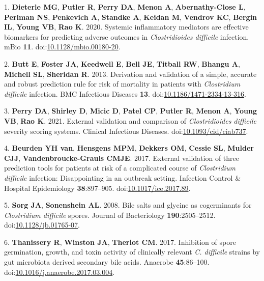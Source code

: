 \documentclass[
  12pt,
]{article}
\newenvironment{cslreferences}%
  {}%
  {\par}
\begin{document}
\hypertarget{refs}{}
\begin{cslreferences}
\leavevmode\hypertarget{ref-Dieterle2020}{}%
1. \textbf{Dieterle MG}, \textbf{Putler R}, \textbf{Perry DA},
\textbf{Menon A}, \textbf{Abernathy-Close L}, \textbf{Perlman NS},
\textbf{Penkevich A}, \textbf{Standke A}, \textbf{Keidan M},
\textbf{Vendrov KC}, \textbf{Bergin IL}, \textbf{Young VB}, \textbf{Rao
K}. 2020. Systemic inflammatory mediators are effective biomarkers for
predicting adverse outcomes in \emph{Clostridioides difficile}
infection. mBio \textbf{11}.
doi:\href{https://doi.org/10.1128/mbio.00180-20}{10.1128/mbio.00180-20}.

\leavevmode\hypertarget{ref-Butt2013}{}%
2. \textbf{Butt E}, \textbf{Foster JA}, \textbf{Keedwell E},
\textbf{Bell JE}, \textbf{Titball RW}, \textbf{Bhangu A},
\textbf{Michell SL}, \textbf{Sheridan R}. 2013. Derivation and
validation of a simple, accurate and robust prediction rule for risk of
mortality in patients with \emph{Clostridium difficile} infection. BMC
Infectious Diseases \textbf{13}.
doi:\href{https://doi.org/10.1186/1471-2334-13-316}{10.1186/1471-2334-13-316}.

\leavevmode\hypertarget{ref-Perry2021}{}%
3. \textbf{Perry DA}, \textbf{Shirley D}, \textbf{Micic D},
\textbf{Patel CP}, \textbf{Putler R}, \textbf{Menon A}, \textbf{Young
VB}, \textbf{Rao K}. 2021. External validation and comparison of
\emph{Clostridioides difficile} severity scoring systems. Clinical
Infectious Diseases.
doi:\href{https://doi.org/10.1093/cid/ciab737}{10.1093/cid/ciab737}.

\leavevmode\hypertarget{ref-vanBeurden2017}{}%
4. \textbf{Beurden YH van}, \textbf{Hensgens MPM}, \textbf{Dekkers OM},
\textbf{Cessie SL}, \textbf{Mulder CJJ}, \textbf{Vandenbroucke-Grauls
CMJE}. 2017. External validation of three prediction tools for patients
at risk of a complicated course of \emph{Clostridium difficile}
infection: Disappointing in an outbreak setting. Infection Control \&
Hospital Epidemiology \textbf{38}:897--905.
doi:\href{https://doi.org/10.1017/ice.2017.89}{10.1017/ice.2017.89}.

\leavevmode\hypertarget{ref-Sorg2008}{}%
5. \textbf{Sorg JA}, \textbf{Sonenshein AL}. 2008. Bile salts and
glycine as cogerminants for \emph{Clostridium difficile} spores. Journal
of Bacteriology \textbf{190}:2505--2512.
doi:\href{https://doi.org/10.1128/jb.01765-07}{10.1128/jb.01765-07}.

\leavevmode\hypertarget{ref-Thanissery2017}{}%
6. \textbf{Thanissery R}, \textbf{Winston JA}, \textbf{Theriot CM}.
2017. Inhibition of spore germination, growth, and toxin activity of
clinically relevant \emph{C. difficile} strains by gut microbiota
derived secondary bile acids. Anaerobe \textbf{45}:86--100.
doi:\href{https://doi.org/10.1016/j.anaerobe.2017.03.004}{10.1016/j.anaerobe.2017.03.004}.


\end{cslreferences}
\end{document}
